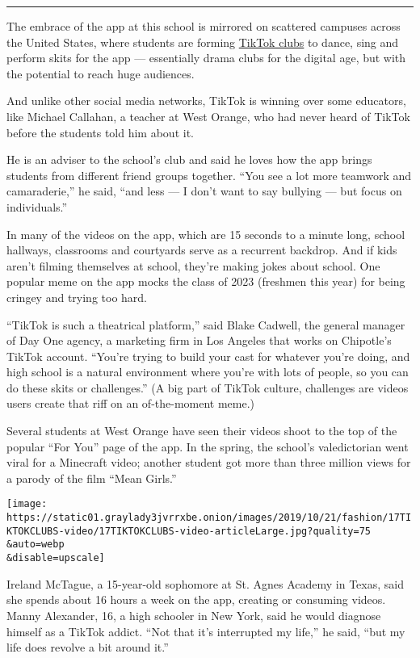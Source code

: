 \begin{center}\rule{0.5\linewidth}{\linethickness}\end{center}

The embrace of the app at this school is mirrored on scattered campuses
across the United States, where students are forming
\href{http://vm.tiktok.com/5q73YA/}{TikTok clubs} to dance, sing and
perform skits for the app --- essentially drama clubs for the digital
age, but with the potential to reach huge audiences.

And unlike other social media networks, TikTok is winning over some
educators, like Michael Callahan, a teacher at West Orange, who had
never heard of TikTok before the students told him about it.

He is an adviser to the school's club and said he loves how the app
brings students from different friend groups together. ``You see a lot
more teamwork and camaraderie,'' he said, ``and less --- I don't want to
say bullying --- but focus on individuals.''

In many of the videos on the app, which are 15 seconds to a minute long,
school hallways, classrooms and courtyards serve as a recurrent
backdrop. And if kids aren't filming themselves at school, they're
making jokes about school. One popular meme on the app mocks the class
of 2023 (freshmen this year) for being cringey and trying too hard.

``TikTok is such a theatrical platform,'' said Blake Cadwell, the
general manager of Day One agency, a marketing firm in Los Angeles that
works on Chipotle's TikTok account. ``You're trying to build your cast
for whatever you're doing, and high school is a natural environment
where you're with lots of people, so you can do these skits or
challenges.'' (A big part of TikTok culture, challenges are videos users
create that riff on an of-the-moment meme.)

Several students at West Orange have seen their videos shoot to the top
of the popular ``For You'' page of the app. In the spring, the school's
valedictorian went viral for a Minecraft video; another student got more
than three million views for a parody of the film ``Mean Girls.''

\texttt{[image: https://static01.graylady3jvrrxbe.onion/images/2019/10/21/fashion/17TIKTOKCLUBS-video/17TIKTOKCLUBS-video-articleLarge.jpg?quality=75\\\&auto=webp\\\&disable=upscale]}

Ireland McTague, a 15-year-old sophomore at St. Agnes Academy in Texas,
said she spends about 16 hours a week on the app, creating or consuming
videos. Manny Alexander, 16, a high schooler in New York, said he would
diagnose himself as a TikTok addict. ``Not that it's interrupted my
life,'' he said, ``but my life does revolve a bit around it.''

